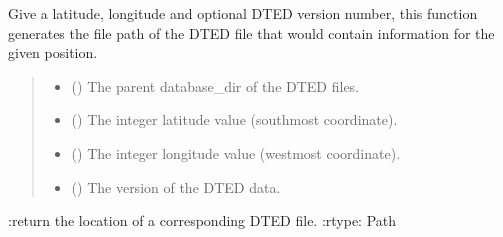 \documentclass[letterpaper,10pt,english]{sphinxmanual}
\begin{document}

\begin{fulllineitems}
\label{\detokenize{modules/earth/dted:qnav.earth.dted.get_dted_file_path}}
\pysigstartsignatures
{}
\pysigstopsignatures
\sphinxAtStartPar
Give a latitude, longitude and optional DTED version number,
this function generates the file path of the DTED file that would
contain information for the given position.
\begin{quote}\begin{description}
\begin{itemize}
\item {} 
\sphinxAtStartPar
{} () \textendash{} The parent database\_dir of the DTED files.

\item {} 
\sphinxAtStartPar
{} () \textendash{} The integer latitude value (south\sphinxhyphen{}most coordinate).

\item {} 
\sphinxAtStartPar
{} () \textendash{} The integer longitude value (west\sphinxhyphen{}most coordinate).

\item {} 
\sphinxAtStartPar
{} () \textendash{} The version of the DTED data.

\end{itemize}

\end{description}\end{quote}

\sphinxAtStartPar
:return the location of a corresponding DTED file.
:rtype: Path

\end{fulllineitems}
\end{document}
